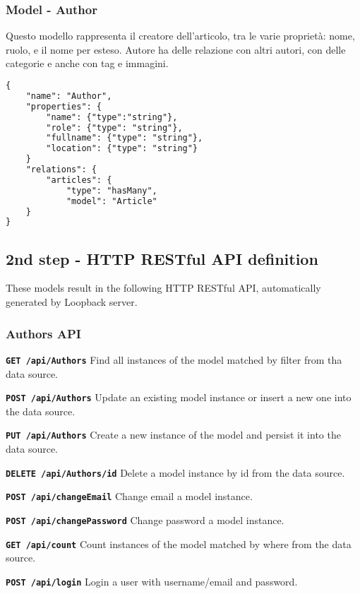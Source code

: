 \subsubsection{Model - Author}

Questo modello rappresenta il creatore dell'articolo, tra le varie proprietà: nome, ruolo, e il nome per esteso.
Autore ha delle relazione con altri autori, con delle categorie e anche con tag e immagini.

\begin{lstlisting}[language=html]
{
	"name": "Author",
	"properties": {
		"name": {"type":"string"},
    	"role": {"type": "string"},
    	"fullname": {"type": "string"},
    	"location": {"type": "string"}
	}
	"relations": {
    	"articles": {
     		"type": "hasMany",
      		"model": "Article"
    }
}
\end{lstlisting}

\subsection{2nd step - HTTP RESTful API definition}

These models result in the following HTTP RESTful API, automatically generated by Loopback server.

\subsubsection{Authors API}

\texttt{\textbf{GET /api/Authors}} Find all instances of the model matched by filter from tha data source.

\texttt{\textbf{POST /api/Authors}} Update an existing model instance or insert a new one into the data source.

\texttt{\textbf{PUT /api/Authors}} Create a new instance of the model and persist it into the data source.

\texttt{\textbf{DELETE /api/Authors/{id}}} Delete a model instance by id from the data source.

\texttt{\textbf{POST /api/changeEmail}} Change email a model instance.

\texttt{\textbf{POST /api/changePassword}} Change password a model instance.

\texttt{\textbf{GET /api/count}} Count instances of the model matched by where from the data source.

\texttt{\textbf{POST /api/login}} Login a user with username/email and password.

